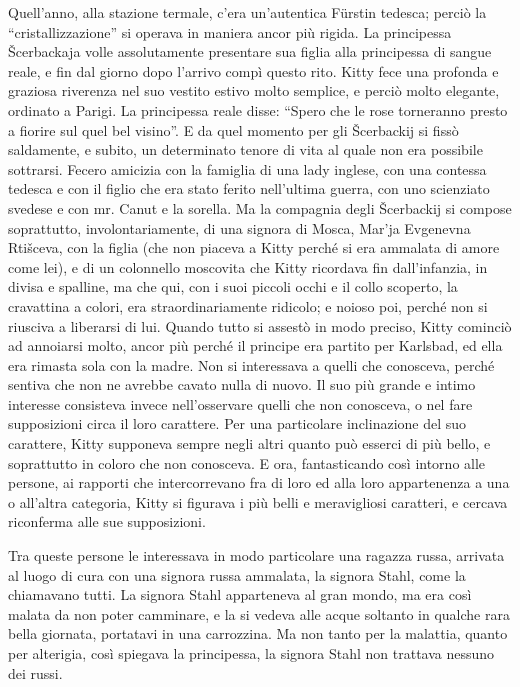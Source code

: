 Quell'anno, alla stazione termale, c'era un'autentica Fürstin tedesca; perciò la ``cristallizzazione'' si operava in maniera ancor più rigida. La principessa Šcerbackaja volle assolutamente presentare sua figlia alla principessa di sangue reale, e fin dal giorno dopo l'arrivo compì questo rito. Kitty fece una profonda e graziosa riverenza nel suo vestito estivo molto semplice, e perciò molto elegante, ordinato a Parigi. La principessa reale disse: ``Spero che le rose torneranno presto a fiorire sul quel bel visino''. E da quel momento per gli Šcerbackij si fissò saldamente, e subito, un determinato tenore di vita al quale non era possibile sottrarsi. Fecero amicizia con la famiglia di una lady inglese, con una contessa tedesca e con il figlio che era stato ferito nell'ultima guerra, con uno scienziato svedese e con mr. Canut e la sorella. Ma la compagnia degli Šcerbackij si compose soprattutto, involontariamente, di una signora di Mosca, Mar'ja Evgenevna Rtišceva, con la figlia (che non piaceva a Kitty perché si era ammalata di amore come lei), e di un colonnello moscovita che Kitty ricordava fin dall'infanzia, in divisa e spalline, ma che qui, con i suoi piccoli occhi e il collo scoperto, la cravattina a colori, era straordinariamente ridicolo; e noioso poi, perché non si riusciva a liberarsi di lui. Quando tutto si assestò in modo preciso, Kitty cominciò ad annoiarsi molto, ancor più perché il principe era partito per Karlsbad, ed ella era rimasta sola con la madre. Non si interessava a quelli che conosceva, perché sentiva che non ne avrebbe cavato nulla di nuovo. Il suo più grande e intimo interesse consisteva invece nell'osservare quelli che non conosceva, o nel fare supposizioni circa il loro carattere. Per una particolare inclinazione del suo carattere, Kitty supponeva sempre negli altri quanto può esserci di più bello, e soprattutto in coloro che non conosceva. E ora, fantasticando così intorno alle persone, ai rapporti che intercorrevano fra di loro ed alla loro appartenenza a una o all'altra categoria, Kitty si figurava i più belli e meravigliosi caratteri, e cercava riconferma alle sue supposizioni. 

Tra queste persone le interessava in modo particolare una ragazza russa, arrivata al luogo di cura con una signora russa ammalata, la signora Stahl, come la chiamavano tutti. La signora Stahl apparteneva al gran mondo, ma era così malata da non poter camminare, e la si vedeva alle acque soltanto in qualche rara bella giornata, portatavi in una carrozzina. Ma non tanto per la malattia, quanto per alterigia, così spiegava la principessa, la signora Stahl non trattava nessuno dei russi. 

